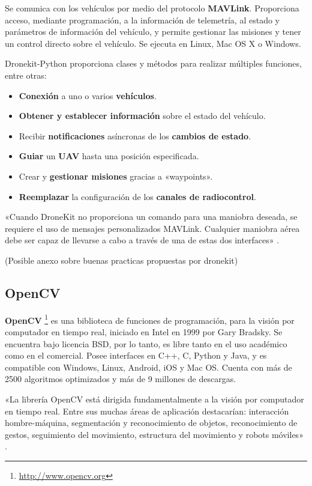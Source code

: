 Se comunica con los vehículos por medio del protocolo \textbf{MAVLink}. Proporciona acceso, mediante programación, a la información 
de telemetría, al estado y parámetros de información del vehículo, y permite gestionar las misiones y tener un control directo 
sobre el vehículo. Se ejecuta en Linux, Mac OS X o Windows. 

\clearpage

Dronekit-Python proporciona clases y métodos para realizar múltiples funciones, entre otras:
\begin{itemize}
\item \textbf{Conexión} a uno o varios \textbf{vehículos}.
\item \textbf{Obtener y establecer información} sobre el estado del vehículo.
\item Recibir \textbf{notificaciones} asíncronas de los \textbf{cambios de estado}.
\item \textbf{Guiar} un \textbf{\acs{UAV}} hasta una posición especificada.
\item Crear y \textbf{gestionar misiones} gracias a «waypoints».
\item \textbf{Reemplazar} la configuración de los \textbf{canales de radiocontrol}.
\end{itemize}

«Cuando DroneKit no proporciona un comando para una maniobra deseada, se requiere el uso de mensajes personalizados MAVLink.
Cualquier maniobra aérea debe ser capaz de llevarse a cabo a través de una de estas dos interfaces» \cite{dronekit}. 

(Posible anexo sobre buenas practicas propuestas por dronekit)

\subsection{OpenCV}
\label{sec:opencv}

\textbf{OpenCV} \footnote{\url{http://www.opencv.org}} es una biblioteca de funciones de programación, para la visión por computador 
en tiempo real, iniciado en Intel en 1999 por Gary Bradsky. Se encuentra bajo licencia BSD, por lo tanto, es libre tanto en el uso
académico como en el comercial. Posee interfaces en C++, C, Python y Java, y es compatible con Windows, Linux, Android, iOS y Mac OS.
Cuenta con más de 2500 algoritmos optimizados y más de 9 millones de descargas.

«La librería OpenCV está dirigida fundamentalmente a la visión por computador en tiempo real. Entre sus muchas áreas de aplicación destacarían: interacción hombre-máquina, segmentación y reconocimiento de objetos, reconocimiento de gestos, seguimiento del movimiento, estructura del movimiento y robots móviles» \cite{opencv}.

